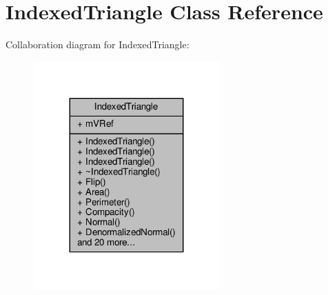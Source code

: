 \hypertarget{classIndexedTriangle}{}\section{Indexed\+Triangle Class Reference}
\label{classIndexedTriangle}


Collaboration diagram for Indexed\+Triangle\+:
\nopagebreak
\begin{figure}[H]
\begin{center}
\leavevmode
\includegraphics[width=203pt]{d9/de1/classIndexedTriangle__coll__graph}
\end{center}
\end{figure}
